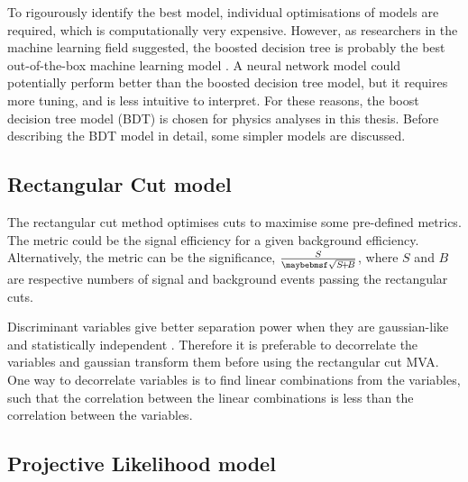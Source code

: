 To rigourously identify the best model, individual optimisations of models are required, which is computationally very expensive. However, as researchers in the machine learning field suggested, the boosted decision tree is probably the best out-of-the-box machine learning model  \cite{hastie2009elements}. A neural network model could potentially perform better than the boosted decision tree model, but it requires more tuning, and is less intuitive to interpret. For these reasons, the boost decision tree model (BDT) is chosen for physics analyses in this thesis. Before describing the BDT model in detail, some simpler models are discussed.

\subsection{Rectangular Cut model}


The rectangular cut method optimises cuts to maximise some pre-defined metrics. The metric could be the signal efficiency for a given background efficiency. Alternatively, the metric can be the significance, $\frac{S}{\rootOf{S\!+\!B}}$, where $S$ and $B$ are respective numbers of  signal and background events passing the rectangular cuts.

Discriminant variables give better separation power when they are gaussian-like and statistically independent \cite{hastie2009elements}. Therefore it is preferable to decorrelate  the variables and gaussian transform them before using the rectangular cut MVA. One way to decorrelate variables is to find linear combinations from the variables, such that the correlation between the  linear combinations is less than the correlation between the variables.


\subsection{Projective Likelihood model}
\label{sec:pandoraLikelihood}


